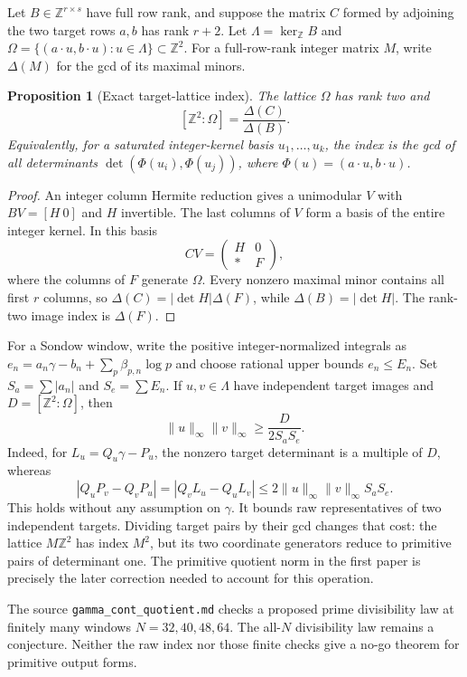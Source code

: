 \documentclass[11pt,a4paper]{article}
\newcommand{\Z}{\mathbb Z}
\newtheorem{proposition}[theorem]{Proposition}
\theoremstyle{definition}
\theoremstyle{remark}
\numberwithin{equation}{section}
\begin{document}
Let $B\in\Z^{r\times s}$ have full row rank, and suppose the matrix
$C$ formed by adjoining the two target rows $a,b$ has rank $r+2$.
Let $\Lambda=\ker_{\Z}B$ and
$\Omega=\{(a\cdot u,b\cdot u):u\in\Lambda\}\subset\Z^2$.
For a full-row-rank integer matrix $M$, write $\Delta(M)$ for the gcd
of its maximal minors.

\begin{proposition}[Exact target-lattice index]
\label{ec:index-theorem}
The lattice $\Omega$ has rank two and
\[
 [\Z^2:\Omega]=\frac{\Delta(C)}{\Delta(B)}.
\]
Equivalently, for a saturated integer-kernel basis $u_1,\ldots,u_k$,
the index is the gcd of all determinants
$\det(\Phi(u_i),\Phi(u_j))$, where $\Phi(u)=(a\cdot u,b\cdot u)$.
\end{proposition}
\begin{proof}
An integer column Hermite reduction gives a unimodular $V$ with
$BV=[H\ 0]$ and $H$ invertible.  The last columns of $V$ form a basis
of the entire integer kernel.  In this basis
\[
 CV=\begin{pmatrix}H&0\\ *&F\end{pmatrix},
\]
where the columns of $F$ generate $\Omega$.  Every nonzero maximal
minor contains all first $r$ columns, so
$\Delta(C)=|\det H|\Delta(F)$, while
$\Delta(B)=|\det H|$.  The rank-two image index is $\Delta(F)$.
\end{proof}

For a Sondow window, write the positive integer-normalized integrals as
$e_n=a_n\gamma-b_n+\sum_p\beta_{p,n}\log p$ and choose rational
upper bounds $e_n\le E_n$.  Set $S_a=\sum|a_n|$ and $S_e=\sum E_n$.
If $u,v\in\Lambda$ have independent target images and
$D=[\Z^2:\Omega]$, then
\[
 \|u\|_\infty\|v\|_\infty\ge\frac{D}{2S_aS_e}.
\]
Indeed, for $L_u=Q_u\gamma-P_u$, the nonzero target determinant is a
multiple of $D$, whereas
\[
 |Q_uP_v-Q_vP_u|=|Q_vL_u-Q_uL_v|
 \le2\|u\|_\infty\|v\|_\infty S_aS_e.
\]
This holds without any assumption on $\gamma$.  It bounds raw
representatives of two independent targets.  Dividing target pairs by
their gcd changes that cost: the lattice $M\Z^2$ has index $M^2$, but
its two coordinate generators reduce to primitive pairs of determinant
one.  The primitive quotient norm in the first paper is precisely the
later correction needed to account for this operation.

The source \texttt{gamma\_cont\_quotient.md} checks a proposed prime
divisibility law at finitely many windows $N=32,40,48,64$.  The
all-$N$ divisibility law remains a conjecture.  Neither the raw index nor
those finite checks give a no-go theorem for primitive output forms.
\end{document}

